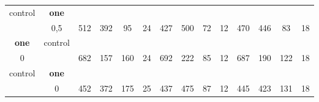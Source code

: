 \begin{table}[]
{\begin{tabular}{|c|c|c|c|c|c|c|c|c|c|c|c|c|c|}
control & \cellcolor{blue!15}\textbf{one}& {\color[HTML]{00009B} } & {\color[HTML]{9A0000} } & {\color[HTML]{009901} } &  & {\color[HTML]{00009B} } & {\color[HTML]{9A0000} } & {\color[HTML]{009901} } &  & {\color[HTML]{00009B} } & {\color[HTML]{9A0000} } & {\color[HTML]{009901} } &  \\ 
 & \cellcolor{ blue!15}0,5 & \multirow{-2}{*}{{\color[HTML]{00009B} 512}} & \multirow{-2}{*}{{\color[HTML]{9A0000} 392}} & \multirow{-2}{*}{{\color[HTML]{009901} 95}} & \multirow{-2}{*}{24} & \multirow{-2}{*}{{\color[HTML]{00009B} 427}} & \multirow{-2}{*}{{\color[HTML]{9A0000} 500}} & \multirow{-2}{*}{{\color[HTML]{009901} 72}} & \multirow{-2}{*}{12} & \multirow{-2}{*}{{\color[HTML]{00009B} 470}} & \multirow{-2}{*}{{\color[HTML]{9A0000} 446}} & \multirow{-2}{*}{{\color[HTML]{009901} 83}} & \multirow{-2}{*}{18} \\ \hline

\cellcolor{blue!15}\textbf{one} & control& {\color[HTML]{00009B} } & {\color[HTML]{9A0000} } & {\color[HTML]{009901} } &  & {\color[HTML]{00009B} } & {\color[HTML]{9A0000} } & {\color[HTML]{009901} } &  & {\color[HTML]{00009B} } & {\color[HTML]{9A0000} } & {\color[HTML]{009901} } &  \\ 
\cellcolor{ blue!15}0 &  & \multirow{-2}{*}{{\color[HTML]{00009B} 682}} & \multirow{-2}{*}{{\color[HTML]{9A0000} 157}} & \multirow{-2}{*}{{\color[HTML]{009901} 160}} & \multirow{-2}{*}{24} & \multirow{-2}{*}{{\color[HTML]{00009B} 692}} & \multirow{-2}{*}{{\color[HTML]{9A0000} 222}} & \multirow{-2}{*}{{\color[HTML]{009901} 85}} & \multirow{-2}{*}{12} & \multirow{-2}{*}{{\color[HTML]{00009B} 687}} & \multirow{-2}{*}{{\color[HTML]{9A0000} 190}} & \multirow{-2}{*}{{\color[HTML]{009901} 122}} & \multirow{-2}{*}{18} \\ \hline

control & \cellcolor{blue!15}\textbf{one}& {\color[HTML]{00009B} } & {\color[HTML]{9A0000} } & {\color[HTML]{009901} } &  & {\color[HTML]{00009B} } & {\color[HTML]{9A0000} } & {\color[HTML]{009901} } &  & {\color[HTML]{00009B} } & {\color[HTML]{9A0000} } & {\color[HTML]{009901} } &  \\ 
 & \cellcolor{ blue!15}0 & \multirow{-2}{*}{{\color[HTML]{00009B} 452}} & \multirow{-2}{*}{{\color[HTML]{9A0000} 372}} & \multirow{-2}{*}{{\color[HTML]{009901} 175}} & \multirow{-2}{*}{25} & \multirow{-2}{*}{{\color[HTML]{00009B} 437}} & \multirow{-2}{*}{{\color[HTML]{9A0000} 475}} & \multirow{-2}{*}{{\color[HTML]{009901} 87}} & \multirow{-2}{*}{12} & \multirow{-2}{*}{{\color[HTML]{00009B} 445}} & \multirow{-2}{*}{{\color[HTML]{9A0000} 423}} & \multirow{-2}{*}{{\color[HTML]{009901} 131}} & \multirow{-2}{*}{18} \\ \hline


\end{tabular}}
\end{table}
